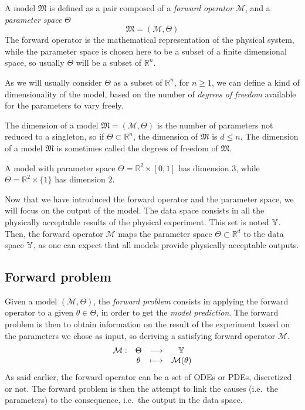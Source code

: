 \documentclass[../../Main_ManuscritThese.tex]{subfiles}
\begin{document}
\begin{definition}[Model]
  A model $\mathfrak{M}$ is defined as a pair composed of a \emph{forward operator} $\mathcal{M}$, and a \emph{parameter space} $\Theta$
  \begin{equation}
    \mathfrak{M} = (\mathcal{M}, \Theta)
  \end{equation}
The forward operator is the mathematical representation of the physical system, while the parameter space is chosen here to be a subset of a finite dimensional space, so usually $\Theta$ will be a subset of $\mathbb{R}^n$.
\end{definition}
As we will usually consider $\Theta$ as a subset of $\mathbb{R}^n$, for $n\geq 1$, we can define a kind of dimensionality of the model, based on the number of \emph{degrees of freedom} available for the parameters to vary freely.
\begin{remark}
  The dimension of a model $\mathfrak{M}=(\mathcal{M},\Theta)$ is the number of parameters not reduced to a singleton, so if $\Theta \subset \mathbb{R}^n$, the dimension of $\mathfrak{M}$ is $d \leq n$. The dimension of a model $\mathfrak{M}$ is sometimes called the degrees of freedom of $\mathfrak{M}$.
  \end{remark}
  
\begin{example}
  A model with parameter space $\Theta = \mathbb{R}^2\times [0, 1]$ has dimension $3$, while $\Theta = \mathbb{R}^2 \times \{1\}$ has dimension $2$.
\end{example}
 Now that we have introduced the forward operator and the parameter space, we will focus on the output of the model.
The data space consists in all the physically acceptable results of the physical experiment. This set is noted $\mathbb{Y}$.
Then, the forward operator $\mathcal{M}$ maps the parameter space $\Theta \subset \mathbb{R}^{d}$ to the data space $\mathbb{Y}$, as one can expect that all models provide physically acceptable outputs.

\subsection{Forward problem}
Given a model $(\mathcal{M}, \Theta)$, the \emph{forward problem} consists in applying the forward operator to a given $\theta \in \Theta$, in order to get the \emph{model prediction}. The forward problem is then to obtain information on the result of the experiment based on the parameters we chose as input, so deriving a satisfying forward operator $\mathcal{M}$.
\begin{equation}
  \begin{array}{cccc}
    \mathcal{M}:& \Theta &\longrightarrow & \mathbb{Y} \\
                & \theta &\longmapsto     & \mathcal{M}(\theta)
  \end{array}
\end{equation}
As said earlier, the forward operator can be a set of ODEs or PDEs, discretized or not. The forward problem is then the attempt to link the causes (i.e.\ the parameters) to the consequence, i.e.\ the output in the data space.
\end{document}
